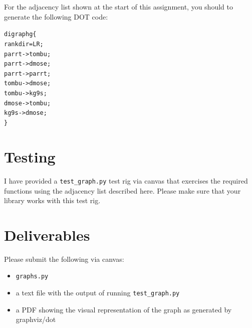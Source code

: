 \begin{fullwidth}
\noindent For the adjacency list shown at the start of this assignment, you should to generate the following DOT code:

\begin{alltt}\small
digraph g \{
  rankdir=LR;
  parrt -> tombu;
  parrt -> dmose;
  parrt -> parrt;
  tombu -> dmose;
  tombu -> kg9s;
  dmose -> tombu;
  kg9s -> dmose;
\}
\end{alltt}

\section{Testing}

I have provided a {\tt test\_graph.py} test rig via canvas that exercises the required functions using the adjacency list described here. Please make sure that your library works with this test rig.

\section{Deliverables}

Please submit the following via canvas:
 
\begin{itemize}
\item {\tt graphs.py}
\item a text file with the output of running {\tt test\_graph.py}
\item a PDF showing the visual representation of the graph as generated by graphviz/dot
\end{itemize}

\end{fullwidth}
